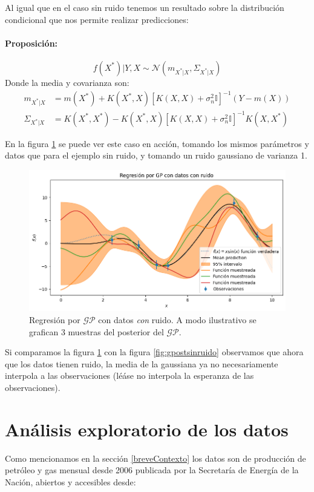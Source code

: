 \documentclass[a4paper]{article}
\newcommand{\gp}{\ensuremath{\mathcal{GP}}}
\begin{document}
Al igual que en el caso sin ruido tenemos un resultado sobre la distribución condicional que nos permite realizar predicciones:
\paragraph{Proposición:} 
	\begin{equation}
	f(X^*)|Y, X  \sim \mathcal{N}(m_{X^*|X}, \Sigma_{X^*|X})\label{eq:gp_posterior}
\end{equation}
Donde la media y covarianza son:
\begin{align}
	m_{X^*|X} & = m(X^*) + K(X^*, X) \left[K(X, X) + \sigma_n^2\mathbb{I}\right]^{-1} \left(Y - m(X)\right)\\
	\Sigma_{X^*|X} & = K(X^*, X^*) - K(X^*, X) \left[K(X, X) + \sigma_n^2\mathbb{I}\right]^{-1} K(X, X^*)
\end{align}

En la figura \ref{fig:gpostconruido} se puede ver este caso en acción, tomando los mismos parámetros y datos que para el ejemplo sin ruido, y tomando un ruido gaussiano de varianza 1.
\begin{figure}[h]
	\centering
	\includegraphics[trim={0cm 0cm 0cm 0cm},clip,width=\textwidth]{gppostconruido.png}
	\caption{Regresión por $\gp$ con datos \emph{con} ruido. A modo ilustrativo se grafican 3 muestras del posterior del $\gp$.}
	\label{fig:gpostconruido}
\end{figure}
Si comparamos la figura \ref{fig:gpostconruido} con la figura \ref{fig:gpostsinruido} observamos que ahora que los datos tienen ruido, la media de la gaussiana ya no necesariamente interpola a las observaciones (léáse no interpola la esperanza de las observaciones).



\section{Análisis exploratorio de los datos}
Como mencionamos en la sección \ref{breveContexto} los datos son de producción de petróleo y gas mensual desde 2006 publicada por la Secretaría de Energía de la Nación, abiertos y accesibles desde: 
\end{document}
